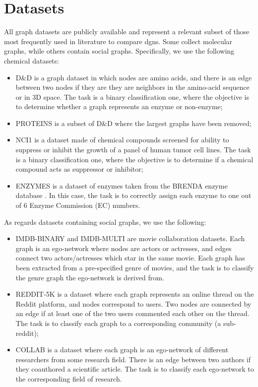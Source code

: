 \section{Datasets}
All  graph  datasets  are  publicly  available \citep{kersting2016benchmark}  and  represent  a  relevant subset of those most frequently used in literature to compare \glspl{dgn}. Some collect molecular graphs, while others contain social graphs. Specifically, we use the following chemical datasets:
\begin{itemize}
    \item D\&D \citep{dobson2003dd} is a graph dataset in which nodes are amino acids, and there is an edge between two nodes if they are they are neighbors in the amino-acid sequence or in 3D space. The task is a binary classification one, where the objective is to determine whether a graph represents an enzyme or non-enzyme;
    \item PROTEINS \citep{borgwardt2005proteins} is a subset of D\&D where the largest graphs have been removed;
    \item NCI1 \citep{wale2008nci1} is a dataset made of chemical compounds screened for ability to suppress or inhibit the growth of a panel of human tumor cell lines. The task is a binary classification one, where the objective is to determine if a chemical compound acts as suppressor or inhibitor;
    \item ENZYMES is a dataset of enzymes taken from the BRENDA enzyme database \citep{schomburg2004enzymes}. In this case, the task is to correctly assign each enzyme to one out of 6 Enzyme Commission (EC) numbers.
\end{itemize}
As regards datasets containing social graphs, we use the following:
\begin{itemize}
    \item IMDB-BINARY and IMDB-MULTI \citep{yanardag2015imdbredditcollab} are movie collaboration datasets. Each graph is an ego-network where nodes are actors or actresses, and edges connect two actors/actresses which star in the same movie. Each graph has been extracted from a pre-specified genre of movies, and the task is to classify the genre graph the ego-network is derived from.
    \item REDDIT-5K \citep{yanardag2015imdbredditcollab} is a dataset where each graph represents an online thread on the Reddit platform, and nodes correspond to users. Two nodes are connected by an edge if at least one of the two users commented each other on the thread. The task is to classify each graph to a corresponding community (a sub-reddit);
    \item COLLAB \citep{yanardag2015imdbredditcollab} is a dataset where each graph is an ego-network of different researchers from some research field. There is an edge between two authors if they coauthored a scientific article. The task is to classify each ego-network to the corresponding field of research.
\end{itemize}
